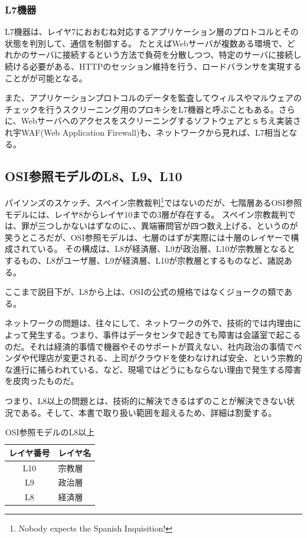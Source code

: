 \subsubsection{L7機器}

L7機器は、レイヤ7におおむね対応するアプリケーション層のプロトコルとその状態を判別して、通信を制御する。
たとえばWebサーバが複数ある環境で、どれかのサーバに接続するという方法で負荷を分散しつつ、特定のサーバに接続し続ける必要がある、HTTPのセッション維持を行う、ロードバランサを実現することがが可能となる。

また、アプリケーションプロトコルのデータを監査してウィルスやマルウェアのチェックを行うスクリーニング用のプロキシをL7機器と呼ぶこともある。さらに、Webサーバへのアクセスをスクリーニングするソフトウェアとｓちえ実装され宇WAF(Web Application Firewall)も、ネットワークから見れば、L7相当となる。

\subsection{OSI参照モデルのL8、L9、L10}

パイソンズのスケッチ、スペイン宗教裁判\footnote{Nobody expects the Spanish Inquisition!}ではないのだが、七階層あるOSI参照モデルには、レイヤ8からレイヤ10までの3層が存在する。
スペイン宗教裁判では、罪が三つしかないはずなのに、、異端審問官が四つ数え上げる、というのが笑うところだが、OSI参照モデルは、七層のはずが実際には十層のレイヤーで構成されている。
その構成は、L8が経済層、L9が政治層、L10が宗教層となるとするもの、L8がユーザ層、L9が経済層、L10が宗教層とするものなど、諸説ある。

ここまで説目下が、L8から上は、OSIの公式の規格ではなくジョークの類である。

ネットワークの問題は、往々にして、ネットワークの外で、技術的では内理由によって発生する。つまり、事件はデータセンタで起きても障害は会議室で起こるのだ。それは経済的事情で機器やそのサポートが買えない、社内政治の事情でベンダや代理店が変更される、上司がクラウドを使わなければ安全、という宗教的な進行に捕らわれている、など、現場ではどうにもならない理由で発生する障害を皮肉ったものだ。

つまり、L8以上の問題とは、技術的に解決できるはずのことが解決できない状況である。そして、本書で取り扱い範囲を超えるため、詳細は割愛する。

\begin{table}[hbtp] 
\begin{center} \label{osirm}
	\begin{tabular}{cl} \toprule 
		レイヤ番号 & レイヤ名 \\ \midrule
		L10 & 宗教層 \\
		L9 & 政治層 \\
		L8 & 経済層 \\ \bottomrule
	\end{tabular}
\end{center} \caption{OSI参照モデルのL8以上}
\end{table}